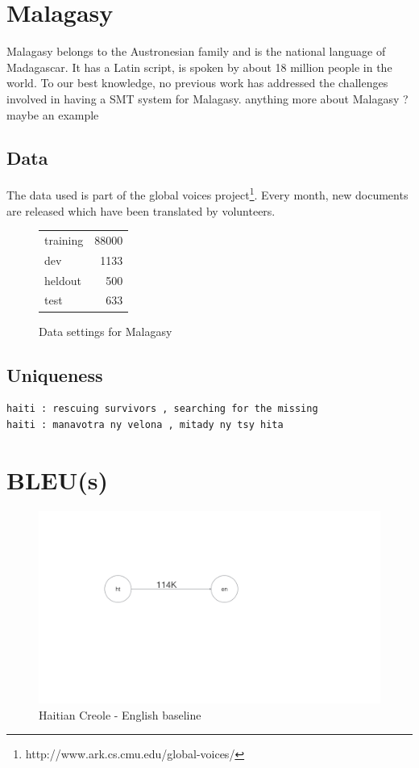 \section{Malagasy}
	Malagasy belongs to the Austronesian family and is the national language of Madagascar. It has a Latin script, is spoken by about 18 million people in the world. To our best knowledge, no previous work has addressed the challenges involved in having a SMT system for Malagasy. \alert{anything more about Malagasy ?maybe an example }
\subsection{Data}
	The data used is part of the global voices project\footnote[1]{http://www.ark.cs.cmu.edu/global-voices/}. Every month, new documents are released which have been translated by volunteers. 

	\begin{figure}[ht]
		\small
		\centering
		\begin{tabular}{l|r} 
			training & 88000 \\
			dev & 1133 \\
			heldout & 500 \\
			test & 633 \\
		\end{tabular}
		\caption{Data settings for Malagasy}
	\end{figure}

\subsection{Uniqueness}

\begin{verbatim}
haiti : rescuing survivors , searching for the missing
haiti : manavotra ny velona , mitady ny tsy hita 
\end{verbatim}
\section{BLEU(s)}
\label{sec:baseline_results}

\begin{figure}[h]
	\small
	\centering
	\includegraphics[trim=4cm 4cm 4cm 4cm, clip=true, totalheight=0.5\textheight]{files/Figures/baseline.jpg}
	\caption{Haitian Creole - English baseline}
	\label{fig:training}
\end{figure}

